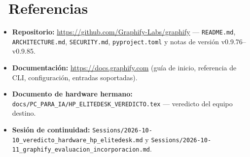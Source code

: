 \documentclass[11pt,a4paper]{article}
\newcommand{\iconotexto}[2]{\textcolor{cyanNeon}{\faIcon{#1}}~#2}
\begin{document}
\section[Referencias]{\iconotexto{book}{Referencias}}

\begin{itemize}[leftmargin=1.4em]
    \item \textbf{Repositorio:} \url{https://github.com/Graphify-Labs/graphify} ---
    \texttt{README.md}, \texttt{ARCHITECTURE.md}, \texttt{SECURITY.md},
    \texttt{pyproject.toml} y notas de versión v0.9.76--v0.9.85.
    \item \textbf{Documentación:} \url{https://docs.graphify.com}
    (guía de inicio, referencia de CLI, configuración, entradas soportadas).
    \item \textbf{Documento de hardware hermano:}
    \texttt{docs/PC\_PARA\_IA/HP\_ELITEDESK\_VEREDICTO.tex} --- veredicto del equipo
    destino.
    \item \textbf{Sesión de continuidad:}
    \texttt{Sessions/2026-10-10\_veredicto\_hardware\_hp\_elitedesk.md} y
    \texttt{Sessions/2026-10-11\_graphify\_evaluacion\_incorporacion.md}.
\end{itemize}
\end{document}
